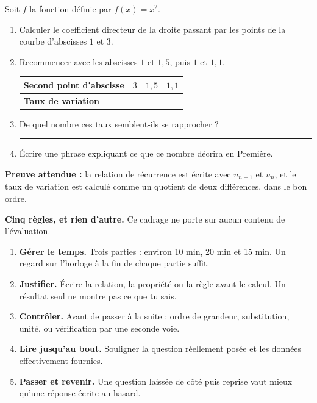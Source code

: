 \documentclass[10pt,a4paper]{article}
\begin{document}
Soit $f$ la fonction définie par $f(x) = x^2$.
\begin{enumerate}
\item Calculer le coefficient directeur de la droite passant par les points de la courbe d'abscisses $1$ et $3$.
\item Recommencer avec les abscisses $1$ et $1{,}5$, puis $1$ et $1{,}1$.
\par\noindent\begin{tabularx}{\linewidth}{|>{\bfseries}p{40mm}|X|X|X|}
\hline
Second point d'abscisse & $3$ & $1{,}5$ & $1{,}1$ \\ \hline
Taux de variation & & & \\ \hline
\end{tabularx}
\item De quel nombre ces taux semblent-ils se rapprocher ? \rule{40mm}{0.32pt}
\item Écrire une phrase expliquant ce que ce nombre décrira en Première.
\end{enumerate}

\begin{successbox}
\textbf{Preuve attendue :} la relation de récurrence est écrite avec $u_{n+1}$ et $u_n$, et le taux de variation
est calculé comme un quotient de deux différences, dans le bon ordre.
\end{successbox}

\needspace{62mm}\par\vspace{3mm}

\begin{methodbox}
\textbf{Cinq règles, et rien d'autre.} Ce cadrage ne porte sur aucun contenu de l'évaluation.
\begin{enumerate}
\item \textbf{Gérer le temps.} Trois parties : environ 10 min, 20 min et 15 min. Un regard sur l'horloge à la fin de chaque partie suffit.
\item \textbf{Justifier.} Écrire la relation, la propriété ou la règle avant le calcul. Un résultat seul ne montre pas ce que tu sais.
\item \textbf{Contrôler.} Avant de passer à la suite : ordre de grandeur, substitution, unité, ou vérification par une seconde voie.
\item \textbf{Lire jusqu'au bout.} Souligner la question réellement posée et les données effectivement fournies.
\item \textbf{Passer et revenir.} Une question laissée de côté puis reprise vaut mieux qu'une réponse écrite au hasard.
\end{enumerate}
\end{methodbox}
\end{document}

